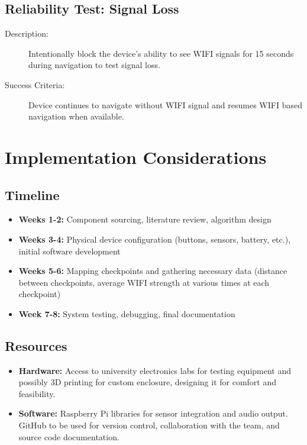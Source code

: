 \documentclass{article}
\begin{document}
\subsection{Reliability Test: Signal Loss}
\begin{description}
    \item[Description:] Intentionally block the device's ability to see WIFI signals for 15 seconds during navigation to test signal loss.
    \item[Success Criteria:] Device continues to navigate without WIFI signal and resumes WIFI based navigation when available.
\end{description}

\section{Implementation Considerations}

\subsection{Timeline}
\begin{itemize}
    \item \textbf{Weeks 1-2:} Component sourcing, literature review, algorithm design
    \item \textbf{Weeks 3-4:} Physical device configuration (buttons, sensors, battery, etc.), initial software development
    \item \textbf{Weeks 5-6:} Mapping checkpoints and gathering necessary data (distance between checkpoints, average WIFI strength at various times at each checkpoint)
    \item \textbf{Week 7-8:} System testing, debugging, final documentation
\end{itemize}

\subsection{Resources}
\begin{itemize}
    \item \textbf{Hardware:} Access to university electronics labs for testing equipment and possibly 3D printing for custom enclosure, designing it for comfort and feasibility.
    \item \textbf{Software:} Raspberry Pi libraries for sensor integration and audio output. GitHub to be used for version control, collaboration with the team, and source code documentation.
\end{itemize}
\end{document}
